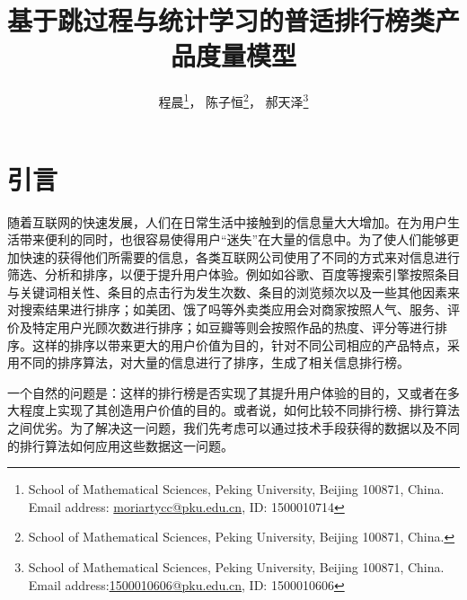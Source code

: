 \documentclass[UTF8]{ctexart}
\theoremstyle{plain}
\theoremstyle{definition}
\theoremstyle{remark}
\begin{document}
	\setcounter{footnote}{1}
	\title{基于跳过程与统计学习的普适排行榜类产品度量模型}
	\author{程晨\footnote{School of Mathematical Sciences, Peking University, Beijing 100871, China. Email address:
			\href{mailto:moriartycc@pku.edu.cn}{moriartycc@pku.edu.cn}, ID: 1500010714}， \quad 陈子恒\footnote{School of Mathematical Sciences, Peking University, Beijing 100871, China. }， \quad 郝天泽\footnote{School of Mathematical Sciences, Peking University, Beijing 100871, China. Email address:\href{mailto:1500010606@pku.edu.cn}{1500010606@pku.edu.cn}, ID: 1500010606}}
	\date{}
	\maketitle
	\newpage
	\tableofcontents
	\newpage
	\section{引言}
    随着互联网的快速发展，人们在日常生活中接触到的信息量大大增加。在为用户生活带来便利的同时，也很容易使得用户“迷失”在大量的信息中。为了使人们能够更加快速的获得他们所需要的信息，各类互联网公司使用了不同的方式来对信息进行筛选、分析和排序，以便于提升用户体验。例如如谷歌、百度等搜索引擎按照条目与关键词相关性、条目的点击行为发生次数、条目的浏览频次以及一些其他因素来对搜索结果进行排序；如美团、饿了吗等外卖类应用会对商家按照人气、服务、评价及特定用户光顾次数进行排序；如豆瓣等则会按照作品的热度、评分等进行排序。这样的排序以带来更大的用户价值为目的，针对不同公司相应的产品特点，采用不同的排序算法，对大量的信息进行了排序，生成了相关信息排行榜。

    一个自然的问题是：这样的排行榜是否实现了其提升用户体验的目的，又或者在多大程度上实现了其创造用户价值的目的。或者说，如何比较不同排行榜、排行算法之间优劣。为了解决这一问题，我们先考虑可以通过技术手段获得的数据以及不同的排行算法如何应用这些数据这一问题。
\end{document}
